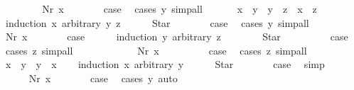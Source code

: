 \begin{isabellebody}
\ \ \isamarkupfalse%
\isanewline
\ \ \ \ \isamarkupfalse%
\ {\isacharparenleft}Nr\ x{\isacharparenright}\isanewline
\ \ \ \ \isamarkupfalse%
\ \isamarkupfalse%
\ {\isacharquery}case\ \isamarkupfalse%
\ {\isacharparenleft}cases\ y{\isacharparenright}\ simp{\isacharunderscore}all\isanewline
\ \ \isamarkupfalse%
\isanewline
\isanewline
\ \ \isamarkupfalse%
\ {\isachardoublequoteopen}x\ {\isasymle}\ y\ {\isasymLongrightarrow}\ y\ {\isasymle}\ z\ {\isasymLongrightarrow}\ x\ {\isasymle}\ z{\isachardoublequoteclose}\isanewline
\ \ \isamarkupfalse%
\ {\isacharparenleft}induction\ x\ arbitrary{\isacharcolon}\ y\ z{\isacharparenright}\isanewline
\ \ \ \ \isamarkupfalse%
\ Star\isanewline
\ \ \ \ \isamarkupfalse%
\ \isamarkupfalse%
\ {\isacharquery}case\ \isamarkupfalse%
\ {\isacharparenleft}cases\ y{\isacharparenright}\ simp{\isacharunderscore}all\isanewline
\ \ \isamarkupfalse%
\isanewline
\ \ \ \ \isamarkupfalse%
\ {\isacharparenleft}Nr\ x{\isacharparenright}\isanewline
\ \ \ \ \isamarkupfalse%
\ \isamarkupfalse%
\ {\isacharquery}case\isanewline
\ \ \ \ \isamarkupfalse%
\ {\isacharparenleft}induction\ y\ arbitrary{\isacharcolon}\ z{\isacharparenright}\isanewline
\ \ \ \ \ \ \isamarkupfalse%
\ Star\isanewline
\ \ \ \ \ \ \isamarkupfalse%
\ \isamarkupfalse%
\ {\isacharquery}case\ \isamarkupfalse%
\ {\isacharparenleft}cases\ z{\isacharparenright}\ simp{\isacharunderscore}all\isanewline
\ \ \ \ \isamarkupfalse%
\isanewline
\ \ \ \ \ \ \isamarkupfalse%
\ {\isacharparenleft}Nr\ x{\isacharparenright}\isanewline
\ \ \ \ \ \ \isamarkupfalse%
\ \isamarkupfalse%
\ {\isacharquery}case\ \isamarkupfalse%
\ {\isacharparenleft}cases\ z{\isacharparenright}\ simp{\isacharunderscore}all\isanewline
\ \ \ \ \isamarkupfalse%
\isanewline
\ \ \isamarkupfalse%
\isanewline
\isanewline
\ \ \isamarkupfalse%
\ {\isachardoublequoteopen}x\ {\isasymle}\ y\ {\isasymor}\ y\ {\isasymle}\ x{\isachardoublequoteclose}\isanewline
\ \ \isamarkupfalse%
\ {\isacharparenleft}induction\ x\ arbitrary{\isacharcolon}\ y{\isacharparenright}\isanewline
\ \ \ \ \isamarkupfalse%
\ Star\isanewline
\ \ \ \ \isamarkupfalse%
\ \isamarkupfalse%
\ {\isacharquery}case\ \isamarkupfalse%
\ simp\isanewline
\ \ \isamarkupfalse%
\isanewline
\ \ \ \ \isamarkupfalse%
\ {\isacharparenleft}Nr\ x{\isacharparenright}\isanewline
\ \ \ \ \isamarkupfalse%
\ \isamarkupfalse%
\ {\isacharquery}case\ \isamarkupfalse%
\ {\isacharparenleft}cases\ y{\isacharparenright}\ auto\isanewline
\ \ \isamarkupfalse%
\isanewline
{}\isamarkupfalse%
%
\endisatagproof
{\isafoldproof}%
%
\isadelimproof
%
\endisadelimproof
\end{isabellebody}

